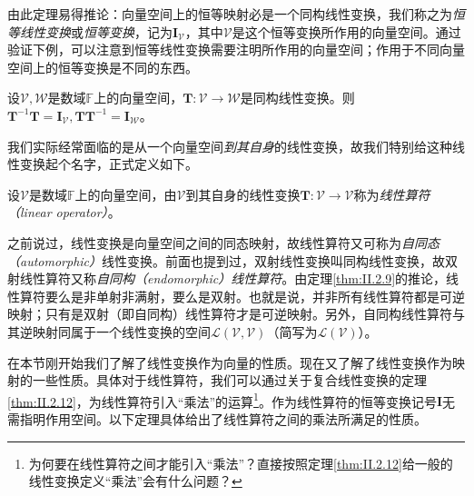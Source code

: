\documentclass[main.tex]{subfiles}
\begin{document}
由此定理易得推论：向量空间上的恒等映射必是一个同构线性变换，我们称之为\emph{恒等线性变换}或\emph{恒等变换}，记为$\mathbf{I}_\mathcal{V}$，其中$\mathcal{V}$是这个恒等变换所作用的向量空间。通过验证下例，可以注意到恒等线性变换需要注明所作用的向量空间；作用于不同向量空间上的恒等变换是不同的东西。

\begin{example}
    设$\mathcal{V},\mathcal{W}$是数域$\mathbb{F}$上的向量空间，$\mathbf{T}:\mathcal{V}\rightarrow\mathcal{W}$是同构线性变换。则$\mathbf{T}^{-1}\mathbf{T}=\mathbf{I}_\mathcal{V},\mathbf{TT}^{-1}=\mathbf{I}_\mathcal{W}$。
\end{example}

我们实际经常面临的是从一个向量空间\emph{到其自身}的线性变换，故我们特别给这种线性变换起个名字，正式定义如下。

\begin{definition}[线性算符]\label{def:II.2.13}
    设$\mathcal{V}$是数域$\mathbb{F}$上的向量空间，由$\mathcal{V}$到其自身的线性变换$\mathbf{T}:\mathcal{V}\rightarrow\mathcal{V}$称为\emph{线性算符（linear operator）}。
\end{definition}

之前说过，线性变换是向量空间之间的同态映射，故线性算符又可称为\emph{自同态（automorphic）}线性变换。前面也提到过，双射线性变换叫同构线性变换，故双射线性算符又称\emph{自同构（endomorphic）线性算符}。由定理\ref{thm:II.2.9}的推论，线性算符要么是非单射非满射，要么是双射。也就是说，并非所有线性算符都是可逆映射；只有是双射（即自同构）线性算符才是可逆映射。另外，自同构线性算符与其逆映射同属于一个线性变换的空间$\mathcal{L}\left(\mathcal{V},\mathcal{V}\right)$（简写为$\mathcal{L}\left(\mathcal{V}\right)$）。

在本节刚开始我们了解了线性变换作为向量的性质。现在又了解了线性变换作为映射的一些性质。具体对于线性算符，我们可以通过关于复合线性变换的定理\ref{thm:II.2.12}，为线性算符引入“乘法”的运算\footnote{为何要在线性算符之间才能引入“乘法”？直接按照定理\ref{thm:II.2.12}给一般的线性变换定义“乘法”会有什么问题？}。作为线性算符的恒等变换记号$\mathbf{I}$无需指明作用空间。以下定理具体给出了线性算符之间的乘法所满足的性质。
\end{document}
